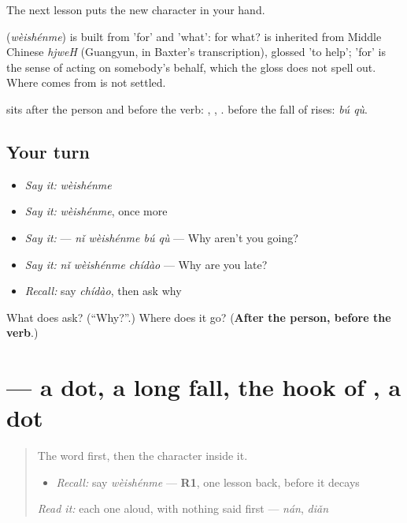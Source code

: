 The next lesson puts the new character in your hand.

\begin{cousinweb}
\textbf{} (\emph{wèishénme}) is built from  'for' and  'what': for what?  is inherited from Middle Chinese \emph{hjweH} (Guangyun, in Baxter's transcription), glossed 'to help'; 'for' is the sense of acting on somebody's behalf, which the gloss does not spell out. Where  comes from is not settled.
\end{cousinweb}

\begin{grammarlens}[title={What you've built}]
 sits after the person and before the verb: , , .  before the fall of  rises: \emph{bú qù}.
\end{grammarlens}

\subsection*{Your turn}
\begin{itemize}
\raggedright
  \item \emph{Say it:} \emph{wèishénme}
  \item \emph{Say it:} \emph{wèishénme}, once more
  \item \emph{Say it:}  — \emph{nǐ wèishénme bú qù} — Why aren't you going?
  \item \emph{Say it:} \emph{nǐ wèishénme chídào} — Why are you late?
  \item \emph{Recall:} say \emph{chídào}, then ask why
\end{itemize}

\begin{tcolorbox}[breakable,colback=teal!4,colframe=teal!35!black,title={Before you move on}]
What does  ask? (\textquotedblleft{}Why?\textquotedblright{}.) Where does it go? (\textbf{After the person, before the verb}.)
\end{tcolorbox}
\section[\texorpdfstring{\zh{为} (wèi)}{为 (wèi)}]{ — a dot, a long fall, the hook of , a dot}

\label{lesson:ZH-W95-wei}



\begin{quote}
The word first, then the character inside it.

\begin{itemize}
\raggedright
  \item \emph{Recall:} say \emph{wèishénme} — \textbf{R1}, one lesson back, before it decays
\end{itemize}

\begin{quote}
 
\end{quote}

\emph{Read it:} each one aloud, with nothing said first — \emph{nán}, \emph{diǎn}
\end{quote}

